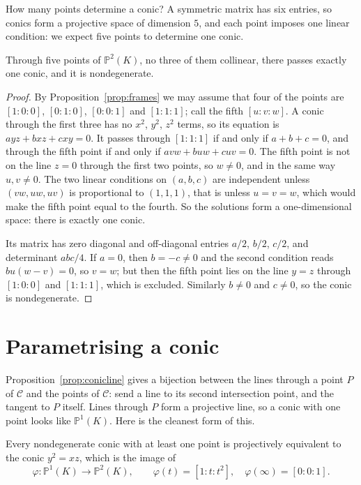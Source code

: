 How many points determine a conic? A symmetric matrix has six entries, so conics form a projective space of dimension $5$, and each point imposes one
linear condition: we expect five points to determine one conic.

\begin{theorem}\label{thm:fivepoints}
Through five points of $\mathbb P^2(K)$, no three of them collinear, there passes exactly one conic, and it is nondegenerate.
\end{theorem}

\begin{proof}
By Proposition~\ref{prop:frames} we may assume that four of the points are $[1:0:0]$, $[0:1:0]$, $[0:0:1]$ and $[1:1:1]$; call the fifth $[u:v:w]$. A
conic through the first three has no $x^2$, $y^2$, $z^2$ terms, so its equation is $ayz+bxz+cxy=0$. It passes through $[1:1:1]$ if and only if
$a+b+c=0$, and through the fifth point if and only if $avw+buw+cuv=0$. The fifth point is not on the line $z=0$ through the first two points, so
$w\ne0$, and in the same way $u,v\ne0$. The two linear conditions on $(a,b,c)$ are independent unless $(vw,uw,uv)$ is proportional to $(1,1,1)$, that
is unless $u=v=w$, which would make the fifth point equal to the fourth. So the solutions form a one-dimensional space: there is exactly one conic.

Its matrix has zero diagonal and off-diagonal entries $a/2$, $b/2$, $c/2$, and determinant $abc/4$. If $a=0$, then $b=-c\ne0$ and the second condition
reads $bu(w-v)=0$, so $v=w$; but then the fifth point lies on the line $y=z$ through $[1:0:0]$ and $[1:1:1]$, which is excluded. Similarly $b\ne0$
and $c\ne0$, so the conic is nondegenerate.
\end{proof}

\section{Parametrising a conic}

Proposition~\ref{prop:conicline} gives a bijection between the lines through a point $P$ of $\mathcal C$ and the points of $\mathcal C$: send a line to its
second intersection point, and the tangent to $P$ itself. Lines through $P$ form a projective line, so a conic with one point looks like
$\mathbb P^1(K)$. Here is the cleanest form of this.

\begin{theorem}\label{thm:normalform}
Every nondegenerate conic with at least one point is projectively equivalent to the conic $y^2=xz$, which is the image of
\[
\varphi:\mathbb P^1(K)\to\mathbb P^2(K),\qquad \varphi(t)=[1:t:t^2],\quad \varphi(\infty)=[0:0:1].
\]
\end{theorem}

